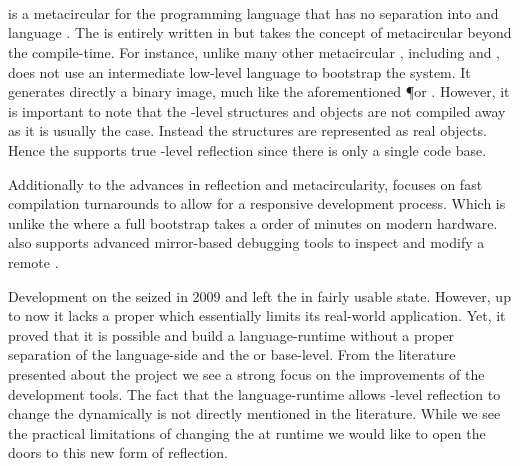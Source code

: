 \\
\\
\\
\\
\\

\subsubsection*{\Klein \VM}
 is a metacircular \VM for the \Self programming language that has no separation into \VM and language \cite{Unga05a}.
The \VM is entirely written in \Self but takes the concept of metacircular beyond the compile-time.
For instance, unlike many other metacircular \VMs, including \Cog and \Squeak, \Klein does not use an intermediate low-level language to bootstrap the system.
It generates directly a binary image, much like the aforementioned \P or \MIST \VM.
However, it is important to note that the \VM-level structures and objects are not compiled away as it is usually the case.
Instead the \VM structures are represented as real \Self objects.
Hence the \Klein \VM supports true \VM-level reflection since there is only a single code base.

Additionally to the advances in reflection and metacircularity, \Klein focuses on fast compilation turnarounds to allow for a responsive development process.
Which is unlike the \Squeak \VM where a full \VM bootstrap takes a order of minutes on modern hardware.
\Klein also supports advanced mirror-based debugging tools to inspect and modify a remote \VM.

Development on the \Klein \VM seized in 2009 and left the \Klein \VM in fairly usable state.
However, up to now it lacks a proper \GC which essentially limits its real-world application.
Yet, it proved that it is possible and build a language-runtime without a proper separation of the language-side and the \VM or base-level.
From the literature presented about the \Klein project we see a strong focus on the improvements of the development tools.
The fact that the language-runtime allows \VM-level reflection to change the \VM dynamically is not directly mentioned in the literature.
While we see the practical limitations of changing the \VM at runtime we would like to open the doors to this new form of reflection.


